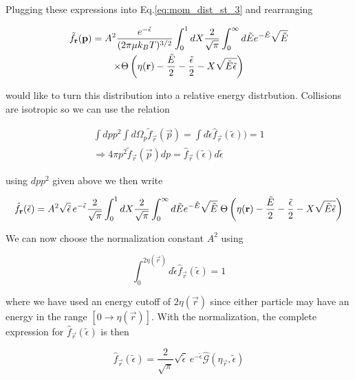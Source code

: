 Plugging these expressions into Eq.\ref{eq:mom_dist_st_3} and rearranging

\begin{multline}
	\tilde{f}_{\mathbf{r}}(\mathbf{p}) = A^2 \frac{e^{-\tilde{\epsilon}}}{(2 \pi \mu k_B T)^{3/2}} \int_0^1 dX \frac{2}{\sqrt{\pi}} \int_0^\infty d \tilde{E} e^{-\tilde{E}}\sqrt{\tilde{E}} \\
	\times \Theta \left( {\eta(\mathbf{r}) - \frac{\tilde{E}}{2} - \frac{\tilde{\epsilon}}{2} - X \sqrt{\tilde{E}\tilde{\epsilon}}} \right)
\end{multline}

would like to turn this distribution into a relative energy distrbution. Collisions are isotropic so we can use the relation

\begin{equation}
\begin{split}
	\int dp p^2 \int d \Omega_p \tilde{f}_{\vec{r}}(\vec{p}) = \int d \tilde{\epsilon} \hat{f}_{\vec{r}}(\tilde{\epsilon})) = 1 \\
	\Rightarrow 4 \pi p^2 \tilde{f}_{\vec{r}}(\vec{p}) dp = \hat{f}_{\vec{r}}(\tilde{\epsilon}) d \tilde{\epsilon}
\end{split}
\end{equation}

using $dp p^2$ given above we then write 

\begin{equation} \label{eq:mom_dist_st_4}
	\hat{f}_{\mathbf{r}}(\tilde{\epsilon}) = A^2 \sqrt{\tilde{\epsilon}} \, e^{-\tilde{\epsilon}} \frac{2}{\sqrt{\pi}} \int_0^1 dX \frac{2}{\sqrt{\pi}} \int_0^\infty d \tilde{E} e^{-\tilde{E}}\sqrt{\tilde{E}} \; \Theta \left( {\eta(\mathbf{r}) - \frac{\tilde{E}}{2} - \frac{\tilde{\epsilon}}{2} - X \sqrt{\tilde{E}\tilde{\epsilon}}} \right)
\end{equation}

We can now choose the normalization constant $A^2$ using

\begin{equation*}
	\int_0^{2\eta(\vec{r})} d \tilde{\epsilon} \hat{f}_{\vec{r}}(\tilde{\epsilon}) = 1
\end{equation*}

where we have used an energy cutoff of $2 \eta(\vec{r})$ since either particle may have an energy in the range $[0 \rightarrow \eta(\vec{r})]$. With the normalization, the complete expression for $\hat{f}_{\vec{r}}(\tilde{\epsilon})$ is then

\begin{equation}
	\hat{f}_{\vec{r}}(\tilde{\epsilon}) = \frac{2}{\sqrt{\pi}} \sqrt{\tilde{\epsilon}} \, e^{-\tilde{\epsilon}} \hat{\mathcal{G}}(\eta_{\vec{r}}, \tilde{\epsilon})
\end{equation}

